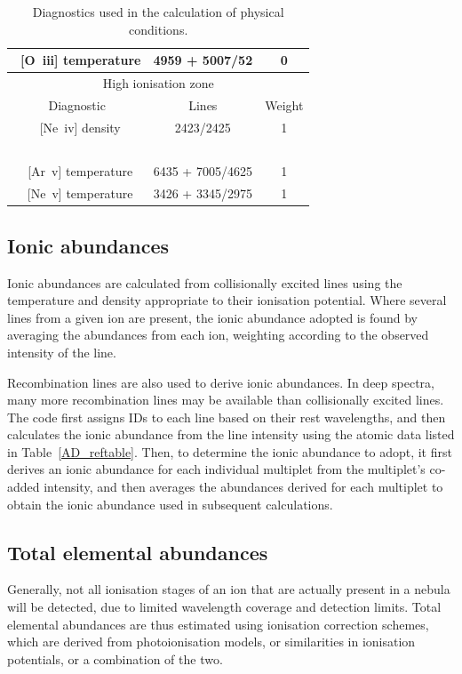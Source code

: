\documentclass[useAMS,usenatbib]{mn2e}
\begin{document}
\begin{table}
\begin{tabular}{ccc}
~[O~{\sc iii}] temperature &4959 + 5007/52 & 0\\
\hline
\multicolumn{3}{c}{High ionisation zone}\\
\hline
Diagnostic & Lines & Weight \\
~[Ne~{\sc iv}] density & 2423/2425 & 1 \\
~\\
~[Ar~{\sc v}] temperature & 6435 + 7005/4625& 1 \\
~[Ne~{\sc v}] temperature & 3426 + 3345/2975 & 1 \\
\end{tabular}
\label{zonestable}
\caption{Diagnostics used in the calculation of physical conditions.}
\end{table}

\subsection{Ionic abundances}

Ionic abundances are calculated from collisionally excited lines using the temperature and density appropriate to their ionisation potential.  Where several lines from a given ion are present, the ionic abundance adopted is found by averaging the abundances from each ion, weighting according to the observed intensity of the line.

Recombination lines are also used to derive ionic abundances.  In deep spectra, many more recombination lines may be available than collisionally excited lines.  The code first assigns IDs to each line based on their rest wavelengths, and then calculates the ionic abundance from the line intensity using the atomic data listed in Table~\ref{AD_reftable}.  Then, to determine the ionic abundance to adopt, it first derives an ionic abundance for each individual multiplet from the multiplet's co-added intensity, and then averages the abundances derived for each multiplet to obtain the ionic abundance used in subsequent calculations.

\subsection{Total elemental abundances}

Generally, not all ionisation stages of an ion that are actually present in a nebula will be detected, due to limited wavelength coverage and detection limits.  Total elemental abundances are thus estimated using ionisation correction schemes, which are derived from photoionisation models, or similarities in ionisation potentials, or a combination of the two.
\end{document}
